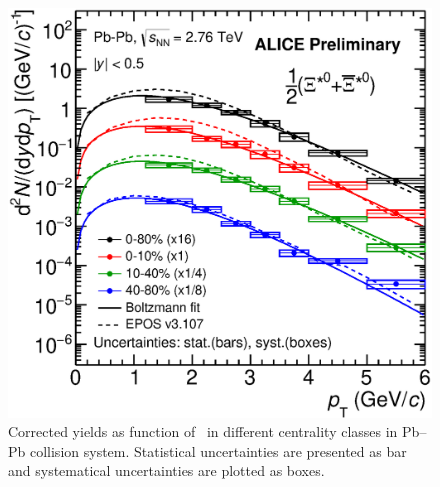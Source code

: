 \begin{figure}[htbp]
\begin{center}
\includegraphics[width=12.0cm]{./Version1/FigChapter5/Spectra/SpectraStatSysPbPb.eps}
\caption{Corrected yields as function of \pt~in different centrality classes in Pb--Pb collision system. Statistical uncertainties are presented as bar and systematical uncertainties are plotted as boxes.} 
\label{fig:PbPb:spectrasysstat}
\end{center}
\end{figure}





